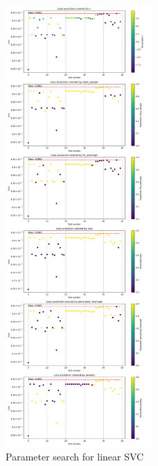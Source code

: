 \documentclass{article}
\begin{document}
    \begin{figure}[H]
        \centering
        \includegraphics[width=0.5\textwidth]{report_img/param_search/linear_svc}
        \caption{Parameter search for linear SVC}
        \label{fig:}
    \end{figure}
\end{document}
